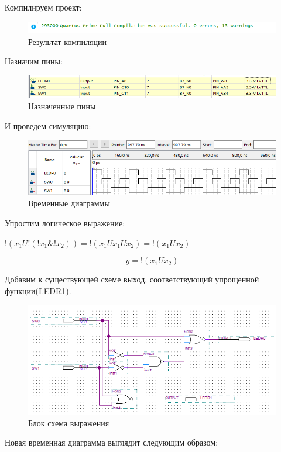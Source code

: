 \documentclass[a4paper,14pt]{article}
\begin{document}
Компилируем проект:

\begin{figure}[H]
	\centering
	\includegraphics[width=0.7\linewidth]{image/01_02}
	\caption{Результат компиляции}
	\label{fig:0102}
\end{figure}

Назначим пины:

\begin{figure}[H]
	\centering
	\includegraphics[width=0.7\linewidth]{image/01_03}
	\caption{Назначенные пины}
	\label{fig:0103}
\end{figure}

И проведем симуляцию:

\begin{figure}[H]
	\centering
	\includegraphics[width=0.7\linewidth]{image/01_04}
	\caption{Временные диаграммы}
	\label{fig:0104}
\end{figure}

Упростим логическое выражение:

$ !(x_1 U !(!x_1 \& !x_2)) = !(x_1 U x_1 U x_2) =  !(x_1 U x_2)$

$$ y =  !(x_1 U x_2)$$
 
Добавим к существующей схеме выход, соответствующий упрощенной функции(LEDR1).
 
\begin{figure}[H]
	\centering
	\includegraphics[width=0.7\linewidth]{image/01_07}
	\caption{Блок схема выражения}
	\label{fig:0107}
\end{figure}

Новая временная диаграмма выглядит следующим образом:
\end{document}
